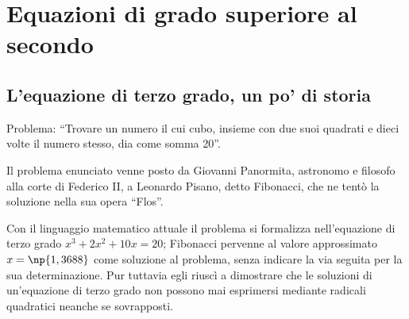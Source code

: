 \chapter{Equazioni di grado superiore al secondo}
\section{L'equazione di terzo grado, un po' di storia}
Problema: ``Trovare un numero il cui cubo, insieme con due suoi quadrati e dieci volte il numero stesso, dia come somma 20''.

Il problema enunciato venne posto da Giovanni Panormita, astronomo e filosofo alla corte di Federico II, a Leonardo Pisano, detto Fibonacci, che ne tentò la soluzione nella sua opera ``Flos''.

Con il linguaggio matematico attuale il problema si formalizza nell'equazione di terzo grado $x^3+2x^2+10x=20$; Fibonacci pervenne al valore approssimato $x=\np{1,3688}$ come soluzione al problema, senza indicare la via seguita per la sua determinazione. Pur tuttavia egli riuscì a dimostrare che le soluzioni di un'equazione di terzo grado non possono mai esprimersi mediante radicali quadratici neanche se sovrapposti.

